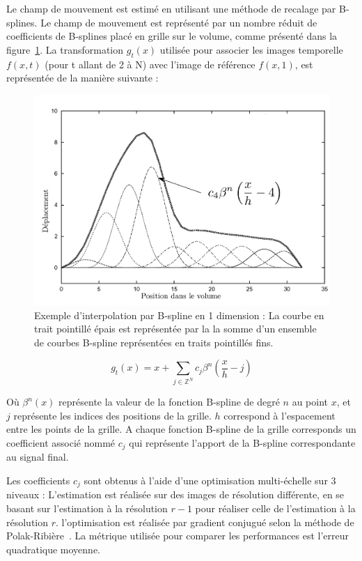 Le champ de mouvement est estimé en utilisant une méthode de recalage par B-splines. Le champ de mouvement est représenté par un nombre réduit de coefficients de B-splines placé en grille sur le volume, comme présenté dans la figure~\ref{fig:Bspline}. La transformation $g_t(x)$ utilisée pour associer les images temporelle  $f(x,t)$ (pour t allant de 2 à N) avec l'image de référence $f(x,1)$, est représentée de la manière suivante :

\begin{figure}
\centering
\includegraphics[width=17cm]{images/Bspline}
\caption[Exemple d'interpolation par B-spline]{Exemple d'interpolation par B-spline en 1 dimension : La courbe en trait pointillé épais est représentée par la la somme d'un ensemble de courbes B-spline représentées en traits pointillés fins.}
\label{fig:Bspline}
\end{figure}


\begin{equation}
  g_t(x)=x + \sum\limits_{j\in \mathbb{Z}^N} c_j \beta^n \left( \frac{x}{h}-j \right)
\end{equation}

Où $\beta^n(x)$ représente la valeur de la fonction B-spline de degré $n$ au point $x$, et $j$ représente les indices des positions de la grille. $h$ correspond à l'espacement entre les points de la grille. A chaque fonction B-spline de la grille corresponds un coefficient associé nommé $c_j$ qui représente l'apport de la B-spline correspondante au signal final.

Les coefficients $c_j$ sont obtenus à l'aide d'une optimisation multi-échelle sur 3 niveaux : L'estimation est réalisée sur des images de résolution différente, en se basant sur l'estimation à la résolution $r-1$ pour réaliser celle de l'estimation à la résolution $r$. l'optimisation est réalisée par gradient conjugué selon la méthode de Polak-Ribière~\cite{polak1969note}. La métrique utilisée pour comparer les performances est l'erreur quadratique moyenne. 


